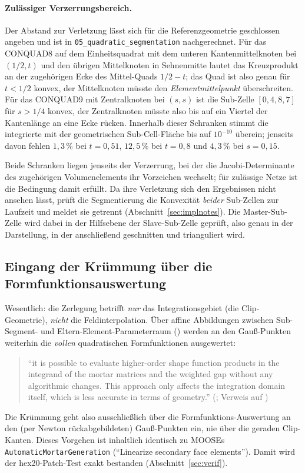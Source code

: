 \documentclass[a4paper,11pt]{article}
\def\tfrac#1#2{#1/#2}%
\newcommand{\code}[1]{\texttt{\small #1}}
\newcommand{\file}[1]{\texttt{\small #1}}
\begin{document}
\paragraph{Zulässiger Verzerrungsbereich.}
Der Abstand zur Verletzung lässt sich für die Referenzgeometrie geschlossen angeben und ist in
\file{05\_quadratic\_segmentation} nachgerechnet. Für das CONQUAD8 auf dem Einheitsquadrat mit dem
unteren Kantenmittelknoten bei $(\tfrac12,t)$ und den übrigen Mittelknoten in Sehnenmitte lautet
das Kreuzprodukt an der zugehörigen Ecke des Mittel-Quads $\tfrac12-t$; das Quad ist also genau für
$t<\tfrac12$ konvex, der Mittelknoten müsste den \emph{Elementmittelpunkt} überschreiten. Für das
CONQUAD9 mit Zentralknoten bei $(s,s)$ ist die Sub-Zelle $[0,4,8,7]$ für $s>\tfrac14$ konvex, der
Zentralknoten müsste also bis auf ein Viertel der Kantenlänge an eine Ecke rücken. Innerhalb dieser
Schranken stimmt die integrierte mit der geometrischen Sub-Cell-Fläche bis auf $10^{-10}$ überein;
jenseits davon fehlen $1{,}3\,\%$ bei $t=0{,}51$, $12{,}5\,\%$ bei $t=0{,}8$ und $4{,}3\,\%$ bei
$s=0{,}15$.

Beide Schranken liegen jenseits der Verzerrung, bei der die Jacobi-Determinante des zugehörigen
Volumenelements ihr Vorzeichen wechselt; für zulässige Netze ist die Bedingung damit erfüllt. Da
ihre Verletzung sich den Ergebnissen nicht ansehen lässt, prüft die Segmentierung die Konvexität
\emph{beider} Sub-Zellen zur Laufzeit und meldet sie getrennt (Abschnitt~\ref{sec:implnotes}).
Die Master-Sub-Zelle wird dabei in der Hilfsebene der Slave-Sub-Zelle geprüft, also genau in der
Darstellung, in der anschließend geschnitten und trianguliert wird.

\subsection{Eingang der Krümmung über die Formfunktionsauswertung}
Wesentlich: die Zerlegung betrifft \emph{nur} das Integrationsgebiet (die Clip-Geometrie), \emph{nicht}
die Feldinterpolation. Über affine Abbildungen zwischen Sub-Segment- und Eltern-Element-Parameterraum
(\citealp[Gl.~(31)/(32)]{puso2008}) werden an den Gauß-Punkten weiterhin die \emph{vollen}
quadratischen Formfunktionen ausgewertet:
\begin{quote}
\small ``it is possible to evaluate higher-order shape function products in the integrand of the
mortar matrices and the weighted gap without any algorithmic changes. This approach only affects the
integration domain itself, which is less accurate in terms of geometry.''
\hfill (\citealp[Anh.~A.1.4, S.~215]{farah}; Verweis auf \citealt{puso2008})
\end{quote}
Die Krümmung geht also ausschließlich über die Formfunktions-Auswertung an den (per Newton
rückabgebildeten) Gauß-Punkten ein, nie über die geraden Clip-Kanten. Dieses Vorgehen ist inhaltlich
identisch zu MOOSEs \code{AutomaticMortarGeneration} (``Linearize secondary face elements''). Damit
wird der hex20-Patch-Test exakt bestanden (Abschnitt~\ref{sec:verif}).
\end{document}
